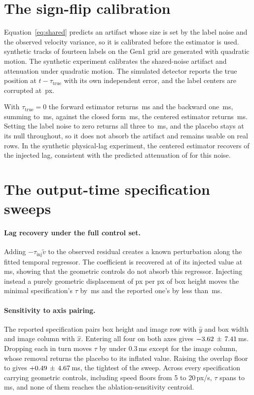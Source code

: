 \documentclass[10pt,twocolumn,letterpaper]{article}
\begin{document}
\section{The sign-flip calibration}
\label{sup:signflip}

Equation~\ref{eq:shared} predicts an artifact whose size is set by the label noise
and the observed velocity variance, so it is calibrated before the estimator is
used. \synTracks{} synthetic tracks of fourteen labels on the Gen1 grid are
generated with quadratic motion. The synthetic experiment calibrates the
shared-noise artifact and attenuation under quadratic motion. The simulated detector reports the true position
at $t-\tau_{\text{true}}$ with its own independent error, and the label centers
are corrupted at \,px.

With $\tau_{\text{true}}=0$ the forward estimator returns \synFwd\,ms and the
backward one \synBack\,ms, summing to \synSum\,ms, against the closed form
\synPred\,ms, the centered estimator returns \synCen\,ms. Setting the label
noise to zero returns all three to \synZero\,ms, and the placebo stays at its
null throughout, so it does not absorb the artifact and remains usable on real
rows. In the synthetic physical-lag experiment, the centered estimator recovers
\synRecover{} of the injected lag, consistent with the predicted attenuation of
\synLambda{} for this noise.

\section{The output-time specification sweeps}
\label{sup:sweeps}

\paragraph{Lag recovery under the full control set.} Adding
$-\tau_{\mathrm{inj}}\tilde v$ to the observed residual creates a known
perturbation along the fitted temporal regressor. The coefficient is recovered
at \injRecovery{} of its injected value at \injLevels\,ms, showing that the
geometric controls do not absorb this regressor. Injecting instead a purely
geometric displacement of \injGeoGamma{} px per px of box height moves the
minimal specification's $\tau$ by \injGeoMin\,ms and the reported one's by less
than \injGeoFull\,ms.

\paragraph{Sensitivity to axis pairing.} The reported specification
pairs box height and image row with $\hat{y}$ and box width and image column with
$\hat{x}$. Entering all four on both axes gives
$-3.62\,\pm\,7.41$\,ms. Dropping each in turn moves $\tau$ by under
0.3\,ms except for the image column, whose removal returns the placebo to its
inflated value. Raising the overlap floor to \satTightIoU{} gives
$+0.49\,\pm\,4.67$\,ms, the tightest of the sweep. Across every
specification carrying geometric controls, including speed floors from 5 to
20\,px/s, $\tau$ spans \satLo{} to \satHi\,ms, and none of them reaches the
ablation-sensitivity centroid.
\end{document}
